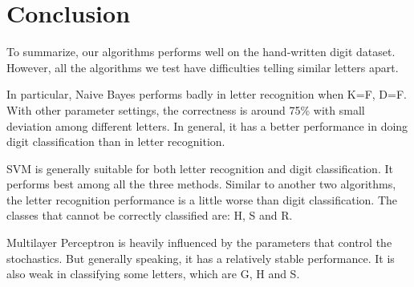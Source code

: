 \documentclass[11pt]{article}
\begin{document}
\section{Conclusion}
To summarize, our algorithms performs well on the hand-written digit dataset. However, all the algorithms we test have difficulties telling similar letters apart.

In particular, Naive Bayes performs badly in letter recognition when K=F, D=F. With other parameter settings, the correctness is around 75\% with small deviation among different letters. In general, it has a better performance in doing digit classification than in letter recognition.

SVM is generally suitable for both letter recognition and digit classification. It performs best among all the three methods. Similar to another two algorithms, the letter recognition performance is a little worse than digit classification. The classes that cannot be correctly classified are: H, S and R.

Multilayer Perceptron is heavily influenced by the parameters that control the stochastics. But generally speaking, it has a relatively stable performance. It is also weak in classifying some letters, which are G, H and S.

\newpage


\end{document}
